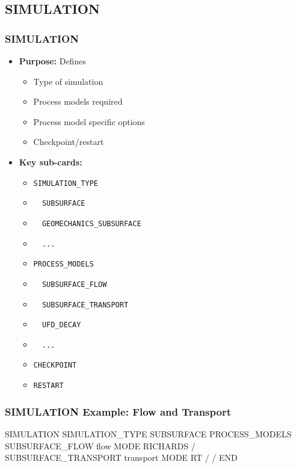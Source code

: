 \subsection{SIMULATION}

\begin{frame}\frametitle{SIMULATION}

\begin{itemize}
\item[] \textbf{Purpose:} Defines 
\begin{itemize}
  \item Type of simulation
  \item Process models required
  \item Process model specific options
  \item Checkpoint/restart
\end{itemize}
\begin{comment}
\item[] \textbf{Example uses:}
\begin{itemize}
  \item 
\end{itemize}
\end{comment}
\item[] \textbf{Key sub-cards:}
\begin{itemize}
\item[] \verb|SIMULATION_TYPE|
\item[] \verb|  SUBSURFACE|
\item[] \verb|  GEOMECHANICS_SUBSURFACE|
\item[] \verb|  ...|
\item[] \verb|PROCESS_MODELS|
\item[] \verb|  SUBSURFACE_FLOW|
\item[] \verb|  SUBSURFACE_TRANSPORT|
\item[] \verb|  UFD_DECAY|
\item[] \verb|  ...|
\item[] \verb|CHECKPOINT|
\item[] \verb|RESTART|
\end{itemize}
\end{itemize}

\end{frame}

\begin{frame}[fragile]\frametitle{SIMULATION Example: Flow and Transport}

\begin{semiverbatim}
SIMULATION
  SIMULATION_TYPE SUBSURFACE
  PROCESS_MODELS
    SUBSURFACE_FLOW flow
      MODE RICHARDS
    /
    SUBSURFACE_TRANSPORT transport
      MODE RT
    /
  /
END
\end{semiverbatim}

\end{frame}

